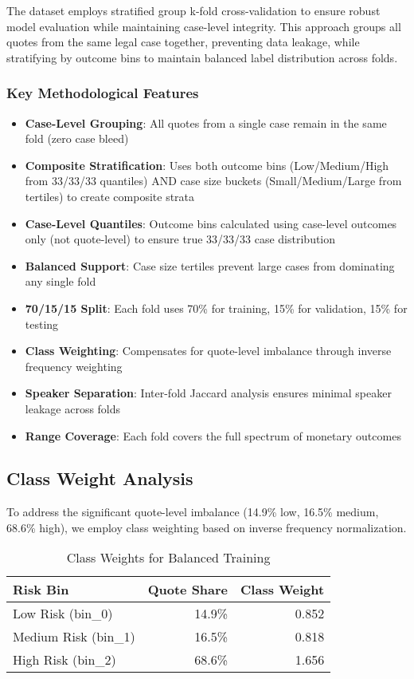 \documentclass[11pt]{article}
\begin{document}
The dataset employs stratified group k-fold cross-validation to ensure robust model evaluation while maintaining case-level integrity. This approach groups all quotes from the same legal case together, preventing data leakage, while stratifying by outcome bins to maintain balanced label distribution across folds.

\subsubsection{Key Methodological Features}
\begin{itemize}
\item \textbf{Case-Level Grouping}: All quotes from a single case remain in the same fold (zero case bleed)
\item \textbf{Composite Stratification}: Uses both outcome bins (Low/Medium/High from 33/33/33 quantiles) AND case size buckets (Small/Medium/Large from tertiles) to create composite strata
\item \textbf{Case-Level Quantiles}: Outcome bins calculated using case-level outcomes only (not quote-level) to ensure true 33/33/33 case distribution
\item \textbf{Balanced Support}: Case size tertiles prevent large cases from dominating any single fold
\item \textbf{70/15/15 Split}: Each fold uses 70\% for training, 15\% for validation, 15\% for testing
\item \textbf{Class Weighting}: Compensates for quote-level imbalance through inverse frequency weighting
\item \textbf{Speaker Separation}: Inter-fold Jaccard analysis ensures minimal speaker leakage across folds
\item \textbf{Range Coverage}: Each fold covers the full spectrum of monetary outcomes
\end{itemize}

\subsection{Class Weight Analysis}

To address the significant quote-level imbalance (14.9\% low, 16.5\% medium, 68.6\% high), we employ class weighting based on inverse frequency normalization.

\begin{table}[H]
\centering
\caption{Class Weights for Balanced Training}
\begin{tabular}{lrr}
\toprule
\textbf{Risk Bin} & \textbf{Quote Share} & \textbf{Class Weight} \\
\midrule
Low Risk (bin\_0) & 14.9\% & 0.852 \\
Medium Risk (bin\_1) & 16.5\% & 0.818 \\
High Risk (bin\_2) & 68.6\% & 1.656 \\
\bottomrule
\end{tabular}
\end{table}
\end{document}
